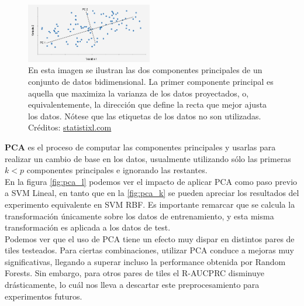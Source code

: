 \begin{figure}[h!]
\centering
  \includegraphics[width=0.49\textwidth]{Kap5/pca.png}
\caption{En esta imagen se ilustran las dos componentes principales de un conjunto de datos bidimensional. La primer componente principal es aquella que maximiza la varianza de los datos proyectados, o, equivalentemente, la dirección que define la recta que mejor ajusta los datos. Nótese que las etiquetas de los datos no son utilizadas. Créditos: \url{statistixl.com}}
\label{fig:pca}
\end{figure}

\textbf{PCA} es el proceso de computar las componentes principales y usarlas para realizar un cambio de base en los datos, usualmente utilizando sólo las primeras $k<p$ componentes principales e ignorando las restantes. \\

En la figura \ref{fig:pca_l} podemos ver el impacto de aplicar PCA como paso previo a SVM Lineal, en tanto que en la \ref{fig:pca_k} se pueden apreciar los resultados del experimento equivalente en SVM RBF. Es importante remarcar que se calcula la transformación únicamente sobre los datos de entrenamiento, y esta misma transformación es aplicada a los datos de test.\\

Podemos ver que el uso de PCA tiene un efecto muy dispar en distintos pares de tiles testeados. Para ciertas combinaciones, utilizar PCA conduce a mejoras muy significativas, llegando a superar incluso la performance obtenida por Random Forests. Sin embargo, para otros pares de tiles el R-AUCPRC disminuye drásticamente, lo cuál nos lleva a descartar este preprocesamiento para experimentos futuros.

